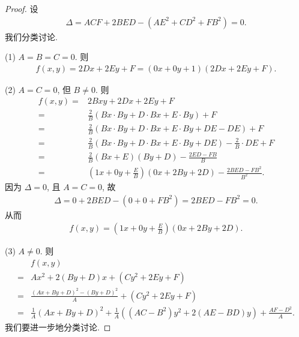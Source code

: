 \begin{proof}
    设
    \begin{align*}
        \Delta = ACF + 2BED - (AE^2 + CD^2 + FB^2) = 0.
    \end{align*}
    我们分类讨论.

    (1)
    \(A = B = C = 0\).
    则
    \begin{align*}
        f(x, y)
        = 2Dx + 2Ey + F
        = (0x + 0y + 1)(2Dx + 2Ey + F).
    \end{align*}

    (2)
    \(A = C = 0\), 但 \(B \neq 0\).
    则
    \begin{align*}
        f(x, y)
        = {} & 2Bxy + 2Dx + 2Ey + F                                                               \\
        = {} & \frac{2}{B}(Bx \cdot By + D \cdot Bx + E \cdot By) + F                             \\
        = {} & \frac{2}{B}(Bx \cdot By + D \cdot Bx + E \cdot By + DE - DE) + F                   \\
        = {} & \frac{2}{B}(Bx \cdot By + D \cdot Bx + E \cdot By + DE) - \frac{2}{B} \cdot DE + F \\
        = {} & \frac{2}{B}(Bx + E)(By + D) - \frac{2ED - FB}{B}                                   \\
        = {} & \left(1x + 0y + \frac{E}{B}\right)(0x + 2By + 2D) - \frac{2BED - FB^2}{B^2}.
    \end{align*}
    因为 \(\Delta = 0\), 且 \(A = C = 0\), 故
    \begin{align*}
        \Delta = 0 + 2BED - (0 + 0 + FB^2) = 2BED - FB^2 = 0.
    \end{align*}
    从而
    \begin{align*}
        f(x, y) = \left(1x + 0y + \frac{E}{B}\right)(0x + 2By + 2D).
    \end{align*}

    (3)
    \(A \neq 0\).
    则
    \begin{align*}
             & f(x, y)                                                                                      \\
        = {} & Ax^2 + 2(By + D)x + (Cy^2 + 2Ey + F)                                                         \\
        = {} & \frac{(Ax + By + D)^2 - (By + D)^2}{A}
        + (Cy^2 + 2Ey + F)                                                                                  \\
        = {} & \frac{1}{A} (Ax + By + D)^2 + \frac{1}{A}((AC - B^2)y^2 + 2(AE - BD)y) + \frac{AF - D^2}{A}.
    \end{align*}
    我们要进一步地分类讨论.


\end{proof}
